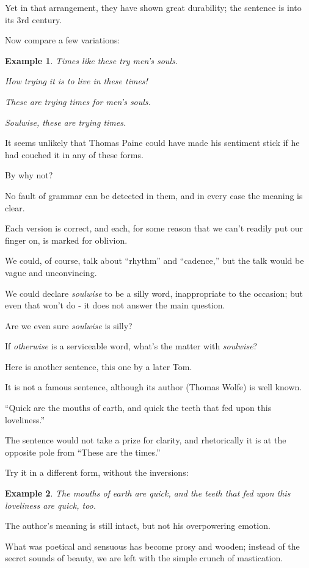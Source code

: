\documentclass{book}
\numberwithin{equation}{section}
\newtheorem{example}{Example}[chapter]
\begin{document}
Yet in that arrangement, they have shown great durability; the sentence is into its 3rd century.

Now compare a few variations:
\begin{example}
    Times like these try men's souls.
    
    How trying it is to live in these times!
    
    These are trying times for men's souls.
    
    Soulwise, these are trying times.
\end{example}
It seems unlikely that Thomas Paine could have made his sentiment stick if he had couched it in any of these forms.

By why not?

No fault of grammar can be detected in them, and in every case the meaning is clear.

Each version is correct, and each, for some reason that we can't readily put our finger on, is marked for oblivion.

We could, of course, talk about ``rhythm'' and ``cadence,'' but the talk would be vague and unconvincing.

We could declare \textit{soulwise} to be a silly word,    inappropriate to the occasion; but even that won't do - it does not answer the main question.

Are we even sure \textit{soulwise} is silly?

If \textit{otherwise} is a serviceable word, what's the matter with \textit{soulwise}?

%
Here is another sentence, this one by a later Tom.

It is not a famous sentence, although its author (Thomas Wolfe) is well known.

``Quick are the mouths of earth, and quick the teeth that fed upon this loveliness.''

The sentence would not take a prize for clarity, and rhetorically it is at the opposite pole from ``These are the times.''

Try it in a different form, without the inversions:
\begin{example}
    The mouths of earth are quick, and the teeth that fed upon this loveliness are quick, too.
\end{example}
The author's meaning is still intact, but not his overpowering emotion.

What was poetical and sensuous has become prosy and wooden; instead of the secret sounds of beauty, we are left with the simple crunch of mastication.
\end{document}
